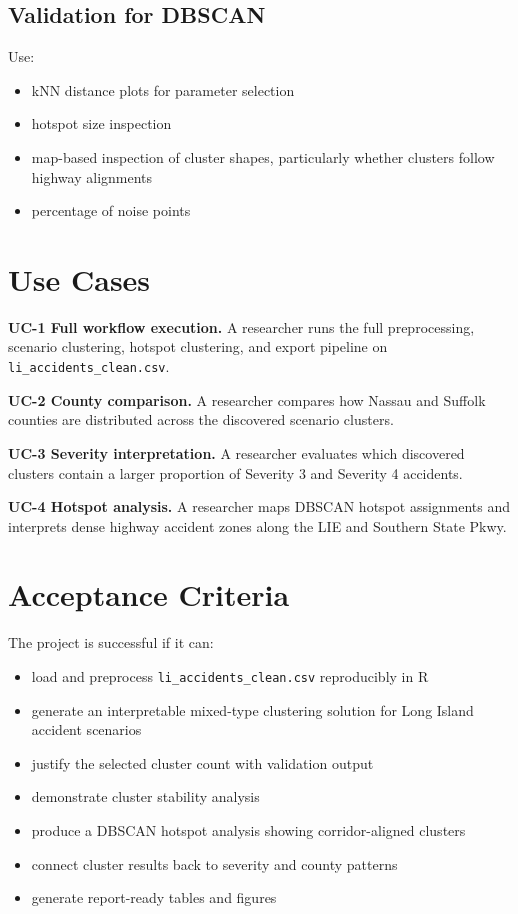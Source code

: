 \documentclass[11pt]{article}
\begin{document}
\subsection{Validation for DBSCAN}

Use:

\begin{itemize}
\item kNN distance plots for parameter selection
\item hotspot size inspection
\item map-based inspection of cluster shapes, particularly whether clusters follow highway alignments
\item percentage of noise points
\end{itemize}

\section{Use Cases}

\textbf{UC-1 Full workflow execution.} A researcher runs the full preprocessing, scenario clustering, hotspot clustering, and export pipeline on \texttt{li\_accidents\_clean.csv}.

\textbf{UC-2 County comparison.} A researcher compares how Nassau and Suffolk counties are distributed across the discovered scenario clusters.

\textbf{UC-3 Severity interpretation.} A researcher evaluates which discovered clusters contain a larger proportion of Severity 3 and Severity 4 accidents.

\textbf{UC-4 Hotspot analysis.} A researcher maps DBSCAN hotspot assignments and interprets dense highway accident zones along the LIE and Southern State Pkwy.

\section{Acceptance Criteria}

The project is successful if it can:

\begin{itemize}
\item load and preprocess \texttt{li\_accidents\_clean.csv} reproducibly in R
\item generate an interpretable mixed-type clustering solution for Long Island accident scenarios
\item justify the selected cluster count with validation output
\item demonstrate cluster stability analysis
\item produce a DBSCAN hotspot analysis showing corridor-aligned clusters
\item connect cluster results back to severity and county patterns
\item generate report-ready tables and figures
\end{itemize}
\end{document}
